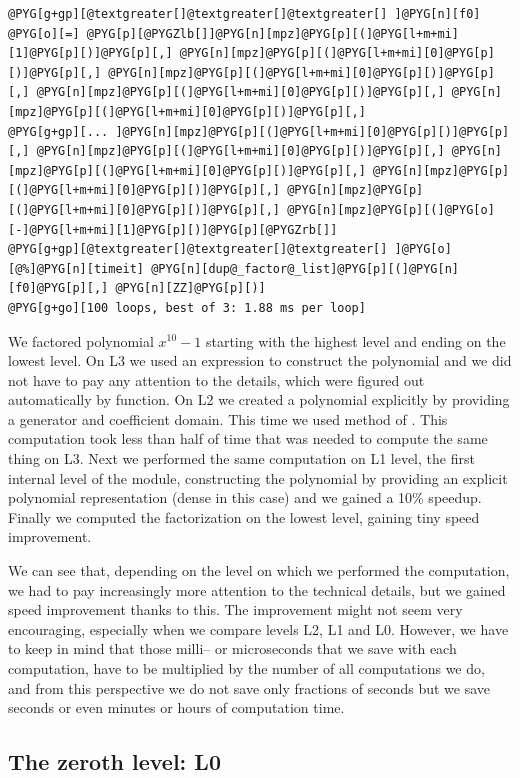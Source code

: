 \begin{Verbatim}[commandchars=@\[\]]
@PYG[g+gp][@textgreater[]@textgreater[]@textgreater[] ]@PYG[n][f0] @PYG[o][=] @PYG[p][@PYGZlb[]]@PYG[n][mpz]@PYG[p][(]@PYG[l+m+mi][1]@PYG[p][)]@PYG[p][,] @PYG[n][mpz]@PYG[p][(]@PYG[l+m+mi][0]@PYG[p][)]@PYG[p][,] @PYG[n][mpz]@PYG[p][(]@PYG[l+m+mi][0]@PYG[p][)]@PYG[p][,] @PYG[n][mpz]@PYG[p][(]@PYG[l+m+mi][0]@PYG[p][)]@PYG[p][,] @PYG[n][mpz]@PYG[p][(]@PYG[l+m+mi][0]@PYG[p][)]@PYG[p][,]
@PYG[g+gp][... ]@PYG[n][mpz]@PYG[p][(]@PYG[l+m+mi][0]@PYG[p][)]@PYG[p][,] @PYG[n][mpz]@PYG[p][(]@PYG[l+m+mi][0]@PYG[p][)]@PYG[p][,] @PYG[n][mpz]@PYG[p][(]@PYG[l+m+mi][0]@PYG[p][)]@PYG[p][,] @PYG[n][mpz]@PYG[p][(]@PYG[l+m+mi][0]@PYG[p][)]@PYG[p][,] @PYG[n][mpz]@PYG[p][(]@PYG[l+m+mi][0]@PYG[p][)]@PYG[p][,] @PYG[n][mpz]@PYG[p][(]@PYG[o][-]@PYG[l+m+mi][1]@PYG[p][)]@PYG[p][@PYGZrb[]]
@PYG[g+gp][@textgreater[]@textgreater[]@textgreater[] ]@PYG[o][@%]@PYG[n][timeit] @PYG[n][dup@_factor@_list]@PYG[p][(]@PYG[n][f0]@PYG[p][,] @PYG[n][ZZ]@PYG[p][)]
@PYG[g+go][100 loops, best of 3: 1.88 ms per loop]
\end{Verbatim}
\noindent
We factored polynomial $x^{10} - 1$ starting with the highest level and ending on the lowest
level. On L3 we used an expression to construct the polynomial and we did not have to pay any
attention to the details, which were figured out automatically by  function.
On L2 we created a polynomial explicitly by providing a generator and coefficient domain. This
time we used  method of . This computation took less than half
of time that was needed to compute the same thing on L3. Next we performed the same computation
on L1 level, the first internal level of the module, constructing the polynomial by providing
an explicit polynomial representation (dense in this case) and we gained a 10\% speedup. Finally
we computed the factorization on the lowest level, gaining tiny speed improvement.

We can see that, depending on the level on which we performed the computation, we had to pay
increasingly more attention to the technical details, but we gained speed improvement thanks
to this. The improvement might not seem very encouraging, especially when we compare levels
L2, L1 and L0. However, we have to keep in mind that those milli-- or microseconds that we
save with each computation, have to be multiplied by the number of all computations we do,
and from this perspective we do not save only fractions of seconds but we save seconds or
even minutes or hours of computation time.


\subsection{The zeroth level: L0}

